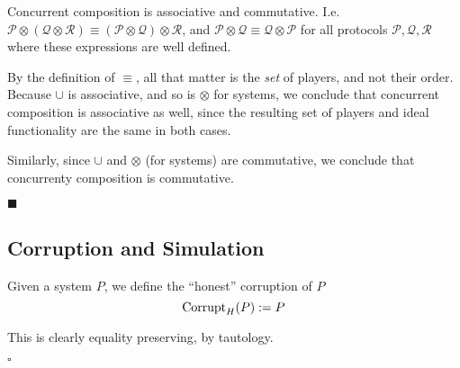 \begin{lemma}
Concurrent composition is associative and commutative.
I.e. $\mathscr{P} \otimes (\mathscr{Q} \otimes \mathscr{R}) \equiv (\mathscr{P} \otimes \mathscr{Q}) \otimes \mathscr{R}$,
and $\mathscr{P} \otimes \mathscr{Q} \equiv \mathscr{Q} \otimes \mathscr{P}$ for
all protocols $\mathscr{P}, \mathscr{Q}, \mathscr{R}$ where these expressions
are well defined.


By the definition of $\equiv$, all that matter is the \emph{set} of players,
and not their order.
Because $\cup$ is associative, and so is $\otimes$ for systems,
we conclude that concurrent composition is associative as well,
since the resulting set of players and ideal functionality are the same
in both cases.

Similarly, since $\cup$ and $\otimes$ (for systems) are commutative,
we conclude that concurrenty composition is commutative.

$\blacksquare$
\end{lemma}

\subsection{Corruption and Simulation}

\begin{definition}
Given a system $P$,
we define the ``honest'' corruption of $P$
$$
\text{Corrupt}_H(P) := P
$$

This is clearly equality preserving, by tautology.

$\square$
\end{definition}

